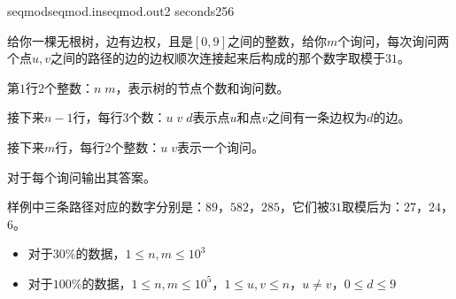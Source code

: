 \documentclass[11pt,a4paper,oneside]{article}
\begin{document}
\begin{problem}{seqmod}{seqmod.in}{seqmod.out}{2 seconds}{256}
	
	给你一棵无根树，边有边权，且是$[0,9]$之间的整数，给你$m$个询问，每次询问两个点$u, v$之间的路径的边的边权顺次连接起来后构成的那个数字取模于$31$。

	\InputFile
	
	第$1$行$2$个整数：$n \; m$，表示树的节点个数和询问数。
	
	接下来$n-1$行，每行$3$个数：$u \; v \; d$表示点$u$和点$v$之间有一条边权为$d$的边。
	
	接下来$m$行，每行$2$个整数：$u \; v$表示一个询问。
	
	\OutputFile
	
	对于每个询问输出其答案。
	
	\Example
	
	\begin{example}
	\end{example}
	
	样例中三条路径对应的数字分别是：$89$，$582$，$285$，它们被$31$取模后为：$27$，$24$，$6$。

\Note
\begin{itemize}
	\item 对于$30\%$的数据，$ 1 \leq n, m \leq 10^3 $
	\item 对于$100\%$的数据，$ 1 \leq n, m \leq 10^5$，$ 1 \leq u, v \leq n $，$ u \neq v$，$ 0 \leq d \leq 9$
\end{itemize}

\end{problem}
\end{document}
